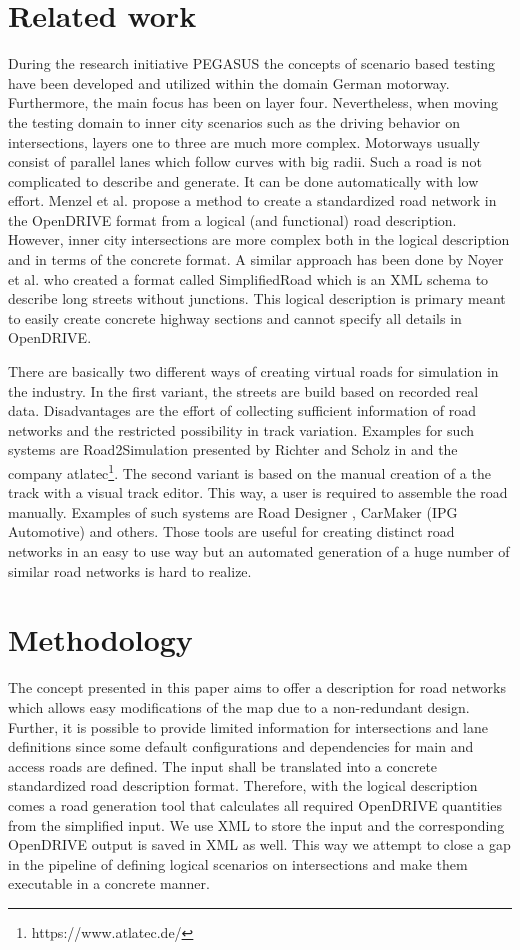 \documentclass[a4paper, 10pt, conference]{ieeeconf}      %
\begin{document}
\section{Related work}
During the research initiative PEGASUS \cite{pegasus.2019} the concepts of scenario based testing have been developed and utilized within the domain German motorway. Furthermore, the main focus has been on layer four. Nevertheless, when moving the testing domain to inner city scenarios such as the driving behavior on intersections, layers one to three are much more complex. Motorways usually consist of parallel lanes which follow curves with big radii. Such a road is not complicated to describe and generate. It can be done automatically with low effort. Menzel et al. \cite{menzel2019functional} propose a method to create a standardized road network in the OpenDRIVE format from a logical (and functional) road description. However, inner city intersections are more complex both in the logical description and in terms of the concrete format. 
A similar approach has been done by Noyer et al. \cite{dlrODRgen} who created a format called SimplifiedRoad which is an XML schema to describe long streets without junctions. This logical description is primary meant to easily create concrete highway sections and cannot specify all details in OpenDRIVE.

There are basically two different ways of creating virtual roads for simulation in the industry. In the first variant, the streets are build based on recorded real data. Disadvantages are the effort of collecting sufficient information of road networks and the restricted possibility in track variation. Examples for such systems are Road2Simulation presented by Richter and Scholz in \cite{dlr110094} and the company atlatec\footnote{https://www.atlatec.de/}.
The second variant is based on the manual creation of a the track with a visual track editor. This way, a user is required to assemble the road manually. Examples of such systems are Road Designer \cite{ROD}, CarMaker (IPG Automotive) and others. Those tools are useful for creating distinct road networks in an easy to use way but an automated generation of a huge number of similar road networks is hard to realize.

\section{Methodology}
The concept presented in this paper aims to offer a description for road networks which allows easy modifications of the map due to a non-redundant design. Further, it is possible to provide limited information for intersections and lane definitions since some default configurations and dependencies for main and access roads are defined. The input shall be translated into a concrete standardized road description format. Therefore, with the logical description comes a road generation tool that calculates all required OpenDRIVE quantities from the simplified input. We use XML to store the input and the corresponding OpenDRIVE output is saved in XML as well. This way we attempt to close a gap in the pipeline of defining logical scenarios on intersections and make them executable in a concrete manner.
\end{document}
